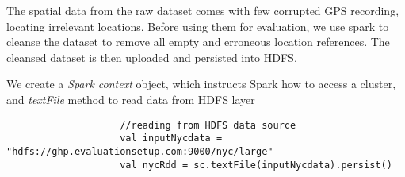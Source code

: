 \documentclass[article,type=msc,colorback,12pt,accentcolor=tud1d]{tudthesis}
\begin{document}
			  The spatial data from the raw dataset comes with few corrupted GPS recording, locating irrelevant locations. Before using them for evaluation, we use spark to cleanse the dataset to remove all empty and erroneous location references. The cleansed dataset is then uploaded and persisted into HDFS. 
			  
			  We create a \textit{Spark context} object, which instructs Spark how to access a cluster,  and \textit{textFile} method to read data from HDFS layer
			  
			  \begin{lstlisting}
					//reading from HDFS data source
					val inputNycdata = "hdfs://ghp.evaluationsetup.com:9000/nyc/large"
				  	val nycRdd = sc.textFile(inputNycdata).persist()		  	
			  \end{lstlisting}
 
\end{document}
